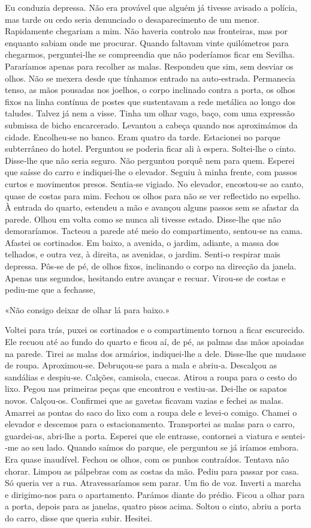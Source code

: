 Eu conduzia depressa. Não era provável que alguém já tivesse avisado a
polícia, mas tarde ou cedo seria denunciado o desaparecimento de um
menor. Rapidamente chegariam a mim. Não haveria controlo nas fronteiras,
mas por enquanto sabiam onde me procurar. Quando faltavam vinte
quilómetros para chegarmos, perguntei­‑lhe se compreendia que não
poderíamos ficar em Sevilha. Pararíamos apenas para recolher as malas.
Respondeu que sim, sem desviar os olhos. Não se mexera desde que
tínhamos entrado na auto­‑estrada. Permanecia tenso, as mãos pousadas
nos joelhos, o corpo inclinado contra a porta, os olhos fixos na linha
contínua de postes que sustentavam a rede metálica ao longo dos taludes.
Talvez já nem a visse. Tinha um olhar vago, baço, com uma expressão
submissa de bicho encarcerado. Levantou a cabeça quando nos aproximámos
da cidade. Encolheu­‑se no banco. Eram quatro da tarde. Estacionei no
parque subterrâneo do hotel. Perguntou se poderia ficar ali à espera.
Soltei­‑lhe o cinto. Disse­‑lhe que não seria seguro. Não perguntou
porquê nem para quem. Esperei que saísse do carro e indiquei­‑lhe o
elevador. Seguiu à minha frente, com passos curtos e movimentos presos.
Sentia­‑se vigiado. No elevador, encostou­‑se ao canto, quase de costas
para mim. Fechou os olhos para não se ver reflectido no espelho. À
entrada do quarto, estendeu a mão e avançou alguns passos sem se afastar
da parede. Olhou em volta como se nunca ali tivesse estado. Disse­‑lhe
que não demoraríamos. Tacteou a parede até meio do compartimento,
sentou­‑se na cama. Afastei os cortinados. Em baixo, a avenida, o
jardim, adiante, a massa dos telhados, e outra vez, à direita, as
avenidas, o jardim. Senti­‑o respirar mais depressa. Pôs­‑se de pé, de
olhos fixos, inclinando o corpo na direcção da janela. Apenas uns
segundos, hesitando entre avançar e recuar. Virou­‑se de costas e
pediu­‑me que a fechasse,

«Não consigo deixar de olhar lá para baixo.»

Voltei para trás, puxei os cortinados e o compartimento tornou a ficar
escurecido. Ele recuou até ao fundo do quarto e ficou aí, de pé, as
palmas das mãos apoiadas na parede. Tirei as malas dos armários,
indiquei­‑lhe a dele. Disse­‑lhe que mudasse de roupa. Aproximou­‑se.
Debruçou­‑se para a mala e abriu­‑a. Descalçou as sandálias e
despiu­‑se. Calções, camisola, cuecas. Atirou a roupa para o cesto do
lixo. Pegou nas primeiras peças que encontrou e vestiu­‑as. Dei­‑lhe os
sapatos novos. Calçou­‑os. Confirmei que as gavetas ficavam vazias e
fechei as malas. Amarrei as pontas do saco do lixo com a roupa dele e
levei­‑o comigo. Chamei o elevador e descemos para o estacionamento.
Transportei as malas para o carro, guardei­‑as, abri­‑lhe a porta.
Esperei que ele entrasse, contornei a viatura e sentei­‑me ao seu lado.
Quando saímos do parque, ele perguntou se já iríamos embora. Era quase
inaudível. Fechou os olhos, com os punhos contraídos. Tentava não
chorar. Limpou as pálpebras com as costas da mão. Pediu para passar por
casa. Só queria ver a rua. Atravessaríamos sem parar. Um fio de voz.
Inverti a marcha e dirigimo­‑nos para o apartamento. Parámos diante do
prédio. Ficou a olhar para a porta, depois para as janelas, quatro pisos
acima. Soltou o cinto, abriu a porta do carro, disse que queria subir.
Hesitei.

